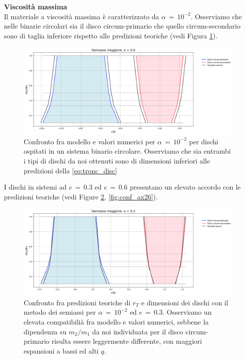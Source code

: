 \textbf{Viscosità massima}\\

Il materiale a viscosità massima è caratterizzato da $\alpha\,=\,10^{-2}$. 
Osserviamo che nelle binarie circolari sia il disco circum-primario che quello circum-secondario sono di taglia inferiore rispetto alle predizioni teoriche (vedi Figura \ref{fig:conf_ax20}).

\begin{figure}[H]
  \centering
  \includegraphics[width=\textwidth]{Immagini/Confronto/confax_A2_e0.png}
  \caption{Confronto fra modello e valori numerici per $\alpha\,=\,10^{-2}$ per dischi ospitati in un sistema binario circolare. Osserviamo che sia entrambi i tipi di dischi da noi ottenuti sono di dimensioni inferiori alle predizioni della \ref{eq:tronc_disc}}
  \label{fig:conf_ax20}
\end{figure}

I dischi in sistemi ad $e\,=\,0.3$ ed $e\,=\,0.6$ presentano un elevato accordo con le predizioni teoriche (vedi Figure \ref{fig:conf_ax23}, \ref{fig:conf_ax26}).

\begin{figure}[H]
  \centering
  \includegraphics[width=\textwidth]{Immagini/Confronto/confax_A2_e3.png}
  \caption{Confronto fra predizioni teoriche di $r_T$ e dimensioni dei dischi con il metodo dei semiassi per $\alpha\,=\,10^{-2}$ ed $e\,=\,0.3$. Osserviamo un elevata compatibilià fra modello e valori numerici, sebbene la dipendenza su $m_2/m_1$ da noi individuata per il disco circum-primario risulta essere leggermente differente, con maggiori espansioni a bassi ed alti $q$.}
  \label{fig:conf_ax23}
\end{figure}

